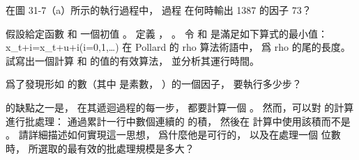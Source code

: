 \startsection[
  title={Integer factorization},
]

\startEXERCISE
在圖 31-7（a）所示的執行過程中，
過程  在何時輸出 1387 的因子 73？
\stopEXERCISE

\startANSWER
{}
\stopANSWER

\startEXERCISE
假設給定函數  和
一個初值 。
定義 ， 。
令  和  是滿足如下算式的最小值：
\startformula
x_{t+i}=x_{t+u+i}(i=0,1,\ldots)
\stopformula
在 Pollard 的 rho 算法術語中，
  爲 rho 的尾的長度。
試寫出一個計算  和  的值的有效算法，
並分析其運行時間。
\stopEXERCISE

\startANSWER
{}
\stopANSWER

\startEXERCISE
爲了發現形如  的數（其中  是素數， ）的一個因子，
  要執行多少步？
\stopEXERCISE

\startANSWER
{}
\stopANSWER

\startEXERCISE\DIFFICULT
{} 的缺點之一是，
在其遞迴過程的每一步，
都要計算一個 \m{\gcd}。
然而，可以對 \m{\gcd} 的計算進行批處理：
通過累計一行中數個連續的  的積，
然後在 \m{\gcd} 計算中使用該積而不是 。
請詳細描述如何實現這一思想，
爲什麼他是可行的，
以及在處理一個 \m{\beta} 位數  時，
所選取的最有效的批處理規模是多大？
\stopEXERCISE

\startANSWER
{}
\stopANSWER

\stopsection
